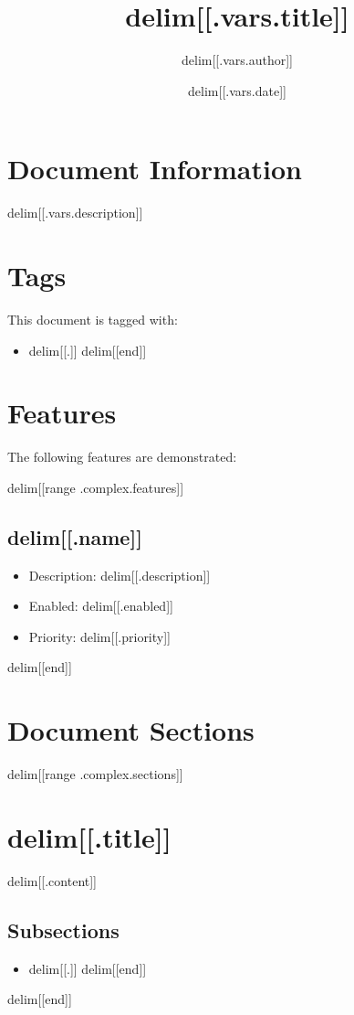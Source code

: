 \documentclass{article}
\title{delim[[.vars.title]]}
\author{delim[[.vars.author]]}
\date{delim[[.vars.date]]}
\begin{document}
\maketitle

\section{Document Information}
delim[[.vars.description]]

\section{Tags}
This document is tagged with:
\begin{itemize}
delim[[range .complex.tags]]
\item delim[[.]]
delim[[end]]
\end{itemize}

\section{Features}
The following features are demonstrated:

delim[[range .complex.features]]
\subsection{delim[[.name]]}
\begin{itemize}
\item Description: delim[[.description]]
\item Enabled: delim[[.enabled]]
\item Priority: delim[[.priority]]
\end{itemize}
delim[[end]]

\section{Document Sections}
delim[[range .complex.sections]]
\section{delim[[.title]]}
delim[[.content]]

\subsection{Subsections}
\begin{itemize}
delim[[range .subsections]]
\item delim[[.]]
delim[[end]]
\end{itemize}
delim[[end]]
\end{document}
